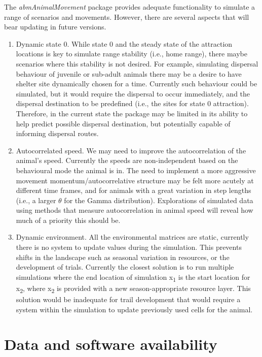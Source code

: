 \documentclass[10pt,a4paper]{article}
\begin{document}
The \emph{abmAnimalMovement} package provides adequate functionality to simulate a range of scenarios and movements.
However, there are several aspects that will bear updating in future versions.

\begin{enumerate}
\def\labelenumi{\arabic{enumi}.}
\item
  Dynamic state 0. While state 0 and the steady state of the attraction locations is key to simulate range stability (i.e., home range), there maybe scenarios where this stability is not desired.
  For example, simulating dispersal behaviour of juvenile or sub-adult animals there may be a desire to have shelter site dynamically chosen for a time.
  Currently such behaviour could be simulated, but it would require the dispersal to occur immediately, and the dispersal destination to be predefined (i.e., the sites for state 0 attraction).
  Therefore, in the current state the package may be limited in its ability to help predict possible dispersal destination, but potentially capable of informing dispersal routes.
\item
  Autocorrelated speed. We may need to improve the autocorrelation of the animal's speed.
  Currently the speeds are non-independent based on the behavioural mode the animal is in.
  The need to implement a more aggressive movement momentum/autocorrelative structure may be felt more acutely at different time frames, and for animals with a great variation in step lengths (i.e., a larger \(\theta\) for the Gamma distribution).
  Explorations of simulated data using methods that measure autocorrelation in animal speed will reveal how much of a priority this should be.
\item
  Dynamic environment. All the environmental matrices are static, currently there is no system to update values during the simulation.
  This prevents shifts in the landscape such as seasonal variation in resources, or the development of trials.
  Currently the closest solution is to run multiple simulations where the end location of simulation x\textsubscript{1} is the start location for x\textsubscript{2}, where x\textsubscript{2} is provided with a new season-appropriate resource layer.
  This solution would be inadequate for trail development that would require a system within the simulation to update previously used cells for the animal.
\end{enumerate}

\hypertarget{data-and-software-availability}{%
\section{Data and software availability}\label{data-and-software-availability}}
\end{document}
